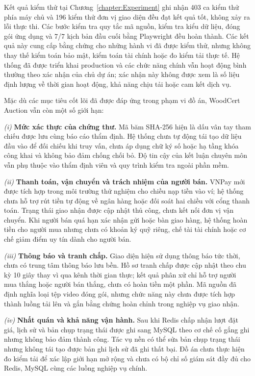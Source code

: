 \documentclass[../DoAn.tex]{subfiles}
\begin{document}
Kết quả kiểm thử tại Chương~\ref{chapter:Experiment} ghi nhận 403 ca kiểm thử phía máy chủ và 196 kiểm thử đơn vị giao diện đều đạt kết quả tốt, không xảy ra lỗi thực thi. Các bước kiểm tra quy tắc mã nguồn, kiểm tra kiểu dữ liệu, đóng gói ứng dụng và 7/7 kịch bản đầu cuối bằng Playwright đều hoàn thành. Các kết quả này cung cấp bằng chứng cho những hành vi đã được kiểm thử, nhưng không thay thế kiểm toán bảo mật, kiểm toán tài chính hoặc đo kiểm tải thực tế. Hệ thống đã được triển khai production và các chức năng chính vẫn hoạt động bình thường theo xác nhận của chủ dự án; xác nhận này không được xem là số liệu định lượng về thời gian hoạt động, khả năng chịu tải hoặc cam kết dịch vụ.

Mặc dù các mục tiêu cốt lõi đã được đáp ứng trong phạm vi đồ án, WoodCert Auction vẫn còn một số giới hạn:

\noindent\textit{(i)} \textbf{Mức xác thực của chứng thư.} Mã băm SHA-256 hiện là dấu vân tay tham chiếu được lưu cùng báo cáo thẩm định. Hệ thống chưa tự động tái tạo dữ liệu đầu vào để đối chiếu khi truy vấn, chưa áp dụng chữ ký số hoặc hạ tầng khóa công khai và không bảo đảm chống chối bỏ. Độ tin cậy của kết luận chuyên môn vẫn phụ thuộc vào thẩm định viên và quy trình kiểm tra ngoài phần mềm.

\noindent\textit{(ii)} \textbf{Thanh toán, vận chuyển và trách nhiệm của người bán.} VNPay mới được tích hợp trong môi trường thử nghiệm cho chiều nạp tiền vào ví; hệ thống chưa hỗ trợ rút tiền tự động về ngân hàng hoặc đối soát hai chiều với cổng thanh toán. Trạng thái giao nhận được cập nhật thủ công, chưa kết nối đơn vị vận chuyển. Khi người bán quá hạn xác nhận gửi hoặc bàn giao hàng, hệ thống hoàn tiền cho người mua nhưng chưa có khoản ký quỹ riêng, chế tài tài chính hoặc cơ chế giảm điểm uy tín dành cho người bán.

\noindent\textit{(iii)} \textbf{Thông báo và tranh chấp.} Giao diện hiện sử dụng thông báo tức thời, chưa có trung tâm thông báo lưu bền. Hồ sơ tranh chấp được cập nhật theo chu kỳ 10 giây thay vì qua kênh thời gian thực; kết quả phân xử chỉ hỗ trợ người mua thắng hoặc người bán thắng, chưa có hoàn tiền một phần. Mã nguồn đã định nghĩa loại tệp video đóng gói, nhưng chức năng này chưa được tích hợp thành luồng tải lên và gắn bằng chứng hoàn chỉnh trong nghiệp vụ giao nhận.

\noindent\textit{(iv)} \textbf{Nhất quán và khả năng vận hành.} Sau khi Redis chấp nhận lượt đặt giá, lịch sử và bản chụp trạng thái được ghi sang MySQL theo cơ chế cố gắng ghi nhưng không bảo đảm thành công. Tác vụ nền có thể sửa bản chụp trạng thái nhưng không tái tạo được bản ghi lịch sử đã ghi thất bại. Đồ án chưa thực hiện đo kiểm tải để xác lập giới hạn mở rộng và chưa có bộ chỉ số giám sát đầy đủ cho Redis, MySQL cùng các luồng nghiệp vụ chính.
\end{document}
